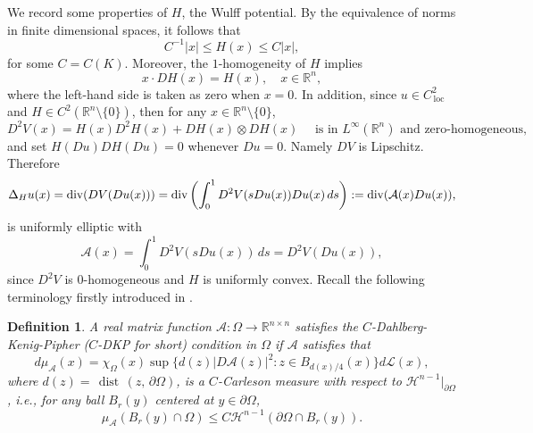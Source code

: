 \documentclass[reqno,11pt]{amsart}
\makeatletter
\def\dist{{\mathop\mathrm{\,dist\,}}}
\def\loc{{\mathop\mathrm{\,loc\,}}}
\newtheorem{defn}[thm]{Definition}%
\numberwithin{equation}{section}
\theoremstyle{remark}
\makeatother
\begin{document}
We record some properties of $H$, the Wulff potential. 
By the equivalence of norms in finite dimensional spaces, it follows that
\begin{equation}\label{equiv norm}
C^{-1}|x|\le H(x)\le C|x|,
\end{equation}
for some $C=C(K).$
Moreover, the $1$-homogeneity of $H$ implies
\begin{equation}\label{H DH}
    x\cdot DH(x)=H(x),\quad x\in \mathbb R^n, 
\end{equation}
where the left-hand side is taken as zero when $x=0$. 
In addition,  since $u\in C^2_{\loc}$ and $H\in C^{2}(\mathbb R^n\setminus\{0\})$, then for any $x\in \mathbb R^n\setminus\{0\}$, 
$$D^2V(x)=H(x)D^2H(x) +DH(x)\otimes DH(x)  \quad \text{ is in  $L^\infty(\mathbb R^n)$ and zero-homogeneous},$$ 
and set $H(Du)DH(Du)=0$ whenever $Du=0$. Namely $DV$ is Lipschitz. 
Therefore
$$\Delta_Hu(x)= {\rm div} ( DV(Du(x)))= {\rm div}\left( \int_0^1 D^2V(sDu(x)) Du(x)\, ds    \right):={\rm div}(\mathcal A(x) Du(x)), $$
 is uniformly elliptic with
 $$\mathcal A(x)=\int_0^1 D^2V(sDu(x))  \, ds= D^2V(Du(x)),$$
 since $D^2V$ is $0$-homogeneous and $H$ is uniformly convex. Recall the following terminology firstly introduced in \cite{KP2001}. 
 
\begin{defn}\label{DKP defn}
A real matrix function $\mathcal A\colon \Omega\to \mathbb R^{n\times n}$ satisfies the  $C$-Dahlberg-Kenig-Pipher ($C$-DKP for short) condition in $\Omega$  if $\mathcal A$ satisfies that
$$d\mu_\mathcal A(x)=\chi_{\Omega}(x) \sup\{
d(z)|D\mathcal A(z)|^2 \colon z\in B_{d(x)/4}(x)\}d\mathcal L(x),$$
where $d(z)=\dist(z,\,\partial \Omega)$, 
is a $C$-Carleson measure with respect to $\mathscr H^{n-1}|_{\partial\Omega}$, i.e.,  for any ball $B_r(y)$ centered at $y\in \partial\Omega$, 
$$\mu_\mathcal A(B_r(y)\cap \Omega)\le C \mathscr H^{n-1}(\partial\Omega\cap B_r(y)). $$
\end{defn}
\end{document}
